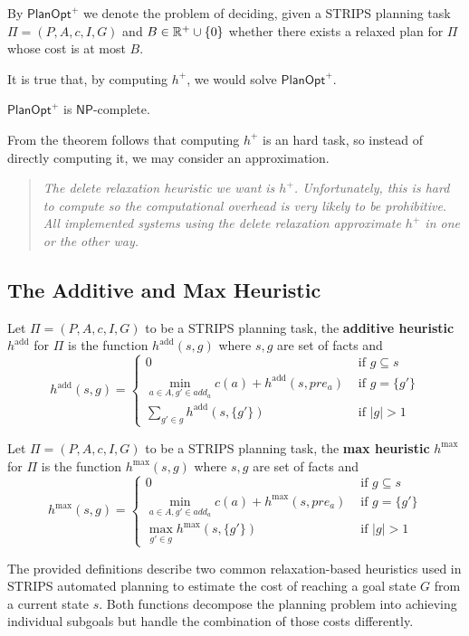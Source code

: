 \documentclass[10pt, letterpaper]{report}
\begin{document}
\begin{definition}
    By $\mathsf{PlanOpt}^+$ we denote the problem of
 deciding, given a STRIPS planning task $\Pi=(P,A,c,I,G)$ and $B\in {\mathbb R}^+\cup\{0\}$ whether there exists a relaxed plan for $\Pi$ whose cost is at most $B$.
\end{definition}
It is true that, by computing $h^+$, we would solve $\mathsf{PlanOpt}^+$.
\begin{theorem}
    $\mathsf{PlanOpt}^+$ is $\mathsf{NP}$-complete. 
\end{theorem}
From the theorem follows that computing $h^+$ is an hard task, so instead of directly computing it, we may consider an approximation.\begin{quotation}
    \textit{
        The delete relaxation heuristic we want is $h^+$. Unfortunately, this is
 hard to compute so the computational overhead is very likely to be
 prohibitive. All implemented systems using the delete relaxation
 approximate $h^+$ in one or the other way.
    }
\end{quotation}
\subsection{The Additive and Max Heuristic}
\begin{definition}
    Let $\Pi=(P,A,c,I,G)$ to be a STRIPS planning task, the \textbf{additive heuristic} $h^{\text{add}}$ for $\Pi$ is the function $h^{\text{add}}(s,g)$ where $s,g$ are set of facts and\begin{equation}
        h^{\text{add}}(s,g)=\begin{cases}
            0&\text{ if }g\subseteq s  \\
            \displaystyle\min_{a\in A,g'\in add_a}c(a)+h^{\text{add}}(s,pre_a)&\text{ if }g=\{g'\}\\
           \displaystyle\sum_{g'\in g}h^{\text{add}}(s,\{g'\}) &\text{ if }|g|>1
        \end{cases}
    \end{equation}
\end{definition}

\begin{definition}
    Let $\Pi=(P,A,c,I,G)$ to be a STRIPS planning task, the \textbf{max heuristic} $h^{\max}$ for $\Pi$ is the function $h^{\max}(s,g)$ where $s,g$ are set of facts and\begin{equation}
        h^{\max}(s,g)=\begin{cases}
            0&\text{ if }g\subseteq s  \\
            \displaystyle\min_{a\in A,g'\in add_a}c(a)+h^{\max}(s,pre_a)&\text{ if }g=\{g'\}\\
           \displaystyle\max_{g'\in g}h^{\max}(s,\{g'\}) &\text{ if }|g|>1
        \end{cases}
    \end{equation}
\end{definition}
The provided definitions describe two common relaxation-based heuristics used in STRIPS automated planning to estimate the cost of reaching a goal state $G$ from a current state $s$. Both functions decompose the planning problem into achieving individual subgoals but handle the combination of those costs differently.\bigskip
\end{document}
